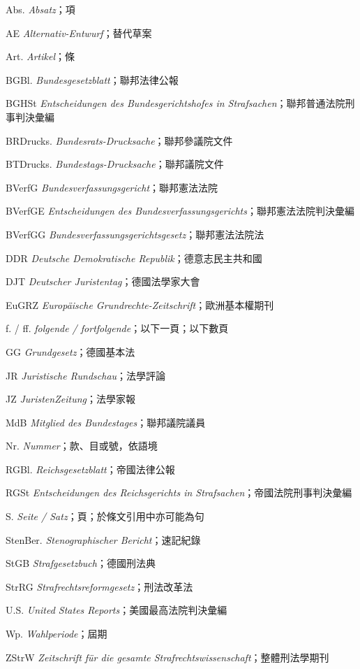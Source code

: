 \documentclass[12pt]{article}
\begin{document}
\begin{termbox}
\begin{termcolumns}
\begin{abbritems}
\item[Abs.] \textit{Absatz}；項
\item[AE] \textit{Alternativ-Entwurf}；替代草案
\item[Art.] \textit{Artikel}；條
\item[BGBl.] \textit{Bundesgesetzblatt}；聯邦法律公報
\item[BGHSt] \textit{Entscheidungen des Bundesgerichtshofes in Strafsachen}；聯邦普通法院刑事判決彙編
\item[BRDrucks.] \textit{Bundesrats-Drucksache}；聯邦參議院文件
\item[BTDrucks.] \textit{Bundestags-Drucksache}；聯邦議院文件
\item[BVerfG] \textit{Bundesverfassungsgericht}；聯邦憲法法院
\item[BVerfGE] \textit{Entscheidungen des Bundesverfassungsgerichts}；聯邦憲法法院判決彙編
\item[BVerfGG] \textit{Bundesverfassungsgerichtsgesetz}；聯邦憲法法院法
\item[DDR] \textit{Deutsche Demokratische Republik}；德意志民主共和國
\item[DJT] \textit{Deutscher Juristentag}；德國法學家大會
\item[EuGRZ] \textit{Europäische Grundrechte-Zeitschrift}；歐洲基本權期刊
\item[f. / ff.] \textit{folgende / fortfolgende}；以下一頁；以下數頁
\item[GG] \textit{Grundgesetz}；德國基本法
\item[JR] \textit{Juristische Rundschau}；法學評論
\item[JZ] \textit{JuristenZeitung}；法學家報
\item[MdB] \textit{Mitglied des Bundestages}；聯邦議院議員
\item[Nr.] \textit{Nummer}；款、目或號，依語境
\item[RGBl.] \textit{Reichsgesetzblatt}；帝國法律公報
\item[RGSt] \textit{Entscheidungen des Reichsgerichts in Strafsachen}；帝國法院刑事判決彙編
\item[S.] \textit{Seite / Satz}；頁；於條文引用中亦可能為句
\item[StenBer.] \textit{Stenographischer Bericht}；速記紀錄
\item[StGB] \textit{Strafgesetzbuch}；德國刑法典
\item[StrRG] \textit{Strafrechtsreformgesetz}；刑法改革法
\item[U.S.] \textit{United States Reports}；美國最高法院判決彙編
\item[Wp.] \textit{Wahlperiode}；屆期
\item[ZStrW] \textit{Zeitschrift für die gesamte Strafrechtswissenschaft}；整體刑法學期刊
\end{abbritems}
\end{termcolumns}
\end{termbox}
\end{document}
